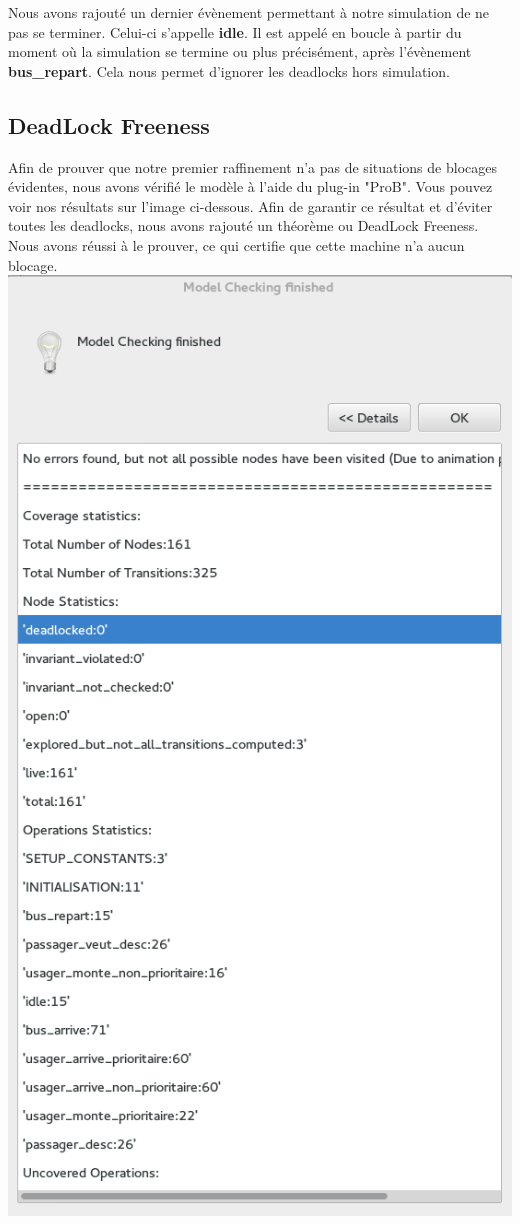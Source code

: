 \documentclass[a4paper,titlepage]{report}
\begin{document}
		Nous avons rajouté un dernier évènement permettant à notre simulation de ne pas se terminer. Celui-ci s'appelle \textbf{idle}. Il est appelé en boucle à partir du moment où la simulation se termine ou plus précisément, après l'évènement \textbf{bus\_repart}. Cela nous permet d'ignorer les deadlocks hors simulation. 
		
		

\subsection{DeadLock Freeness}
	Afin de prouver que notre premier raffinement n'a pas de situations	de blocages évidentes, nous avons vérifié le modèle à l'aide du plug-in "ProB". Vous pouvez voir nos résultats sur l'image ci-dessous. Afin de garantir ce résultat et d'éviter toutes les deadlocks, nous avons rajouté un théorème ou DeadLock Freeness. Nous avons réussi à le prouver, ce qui certifie que cette machine n'a aucun blocage. \\
	
	\includegraphics[scale=0.8]{checkMachineBus1.png}
	
\end{document}
